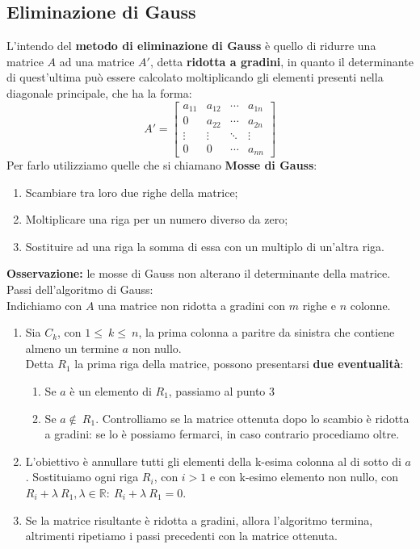\documentclass{article}
\begin{document}
\subsection{Eliminazione di Gauss}
L'intendo del \textbf{metodo di eliminazione di Gauss} è quello di ridurre una
matrice $A$ ad una matrice $A'$, detta \textbf{ridotta a gradini}, in quanto il
determinante di quest'ultima può essere calcolato moltiplicando gli elementi
presenti nella diagonale principale, che ha la forma:
\[
    A' = \begin{bmatrix}
        a_{11} & a_{12} & \cdots & a_{1n} \\
        0      & a_{22} & \cdots & a_{2n} \\
        \vdots & \vdots & \ddots & \vdots \\
        0      & 0      & \cdots & a_{nn}
    \end{bmatrix}
\]
Per farlo utilizziamo quelle che si chiamano \textbf{Mosse di Gauss}:
\begin{enumerate}
    \item Scambiare tra loro due righe della matrice;
    \item Moltiplicare una riga per un numero diverso da zero;
    \item Sostituire ad una riga la somma di essa con un multiplo di un'altra riga.
\end{enumerate}
\textbf{Osservazione:} le mosse di Gauss non alterano il determinante della matrice.\\
Passi dell'algoritmo di Gauss:\\
Indichiamo con $A$ una matrice non ridotta a gradini con $m$ righe e $n$ colonne.
\begin{enumerate}
    \item Sia $C_k$, con $1\leq\ k\leq\ n$, la prima colonna a paritre da sinistra che
          contiene almeno un termine $a$ non nullo.\\ Detta $R_1$ la prima riga della
          matrice, possono presentarsi\textbf{ due eventualità}:
          \begin{enumerate}
              \item Se $a$ è un elemento di $R_1$, passiamo al punto $3$
              \item Se $a\notin\ R_1$. Controlliamo se la matrice ottenuta dopo lo scambio è
                    ridotta a gradini: se lo è possiamo fermarci, in caso contrario procediamo
                    oltre.
          \end{enumerate}
    \item L'obiettivo è annullare tutti gli elementi della k-esima colonna al di sotto di
          $a$. Sostituiamo ogni riga $R_i$, con $i>1$ e con k-esimo elemento non nullo,
          con $R_i+\lambda\ R_1, \lambda\in\mathbb{R}: \ R_i+\lambda\ R_1 = 0$.
    \item Se la matrice risultante è ridotta a gradini, allora l'algoritmo termina,
          altrimenti ripetiamo i passi precedenti con la matrice ottenuta.
\end{enumerate}
\end{document}
